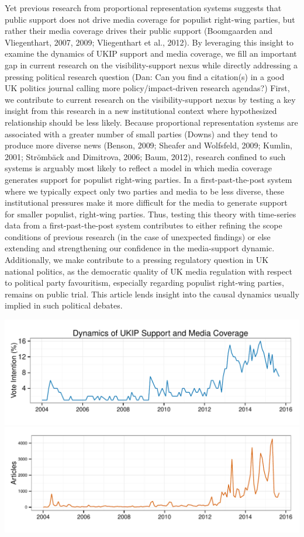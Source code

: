 \documentclass[12pt,article]{article}
\begin{document}
Yet previous research from proportional representation systems suggests
that public support does not drive media coverage for populist
right-wing parties, but rather their media coverage drives their public
support (Boomgaarden and Vliegenthart, 2007, 2009; Vliegenthart et al.,
2012). By leveraging this insight to examine the dynamics of UKIP
support and media coverage, we fill an important gap in current research
on the visibility-support nexus while directly addressing a pressing
political research question (Dan: Can you find a citation(s) in a good
UK politics journal calling more policy/impact-driven research agendas?)
First, we contribute to current research on the visibility-support nexus
by testing a key insight from this research in a new institutional
context where hypothesized relationship should be less likely. Because
proportional representation systems are associated with a greater number
of small parties (Downs) and they tend to produce more diverse news
(Benson, 2009; Sheafer and Wolfsfeld, 2009; Kumlin, 2001; Strömbäck and
Dimitrova, 2006; Baum, 2012), research confined to such systems is
arguably most likely to reflect a model in which media coverage
generates support for populist right-wing parties. In a
first-past-the-post system where we typically expect only two parties
and media to be less diverse, these institutional pressures make it more
difficult for the media to generate support for smaller populist,
right-wing parties. Thus, testing this theory with time-series data from
a first-past-the-post system contributes to either refining the scope
conditions of previous research (in the case of unexpected findings) or
else extending and strengthening our confidence in the media-support
dynamic. Additionally, we make contribute to a pressing regulatory
question in UK national politics, as the democratic quality of UK media
regulation with respect to political party favouritism, especially
regarding populist right-wing parties, remains on public trial. This
article lends insight into the causal dynamics usually implied in such
political debates.

\pagebreak

\includegraphics{ukip_media_files/figure-latex/unnamed-chunk-1-1.pdf}
\includegraphics{ukip_media_files/figure-latex/unnamed-chunk-1-2.pdf}
\end{document}
